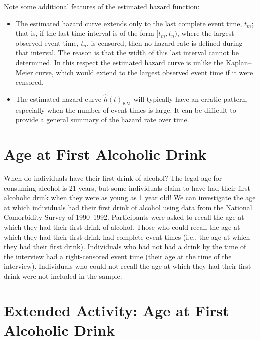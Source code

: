 \documentclass[
]{report}
\providecommand{\tightlist}{%
  \setlength{\itemsep}{0pt}\setlength{\parskip}{0pt}}
\begin{document}
Note some additional features of the estimated hazard function:

\begin{itemize}
\tightlist
\item
  The estimated hazard curve extends only to the last complete event time, \(t_m\); that is, if the last time interval is of the form \([t_m, t_n)\), where the largest observed event time, \(t_n\), is censored, then no hazard rate is defined during that interval. The reason is that the width of this last interval cannot be determined. In this respect the estimated hazard curve is unlike the Kaplan--Meier curve, which would extend to the largest observed event time if it were censored.\\
\item
  The estimated hazard curve \(\hat h(t)_{\mathrm{KM}}\) will typically have an erratic pattern, especially when the number of event times is large. It can be difficult to provide a general summary of the hazard rate over time.
\end{itemize}

\section*{Age at First Alcoholic Drink}\label{age-at-first-alcoholic-drink}

When do individuals have their first drink of alcohol? The legal age for consuming alcohol is 21 years, but some individuals claim to have had their first alcoholic drink when they were as young as 1 year old! We can investigate the age at which individuals had their first drink of alcohol using data from the National Comorbidity Survey of 1990--1992. Participants were asked to recall the age at which they had their first drink of alcohol. Those who could recall the age at which they had their first drink had complete event times (i.e., the age at which they had their first drink). Individuals who had not had a drink by the time of the interview had a right-censored event time (their age at the time of the interview). Individuals who could not recall the age at which they had their first drink were not included in the sample.

\section*{Extended Activity: Age at First Alcoholic Drink}\label{extended-activity-age-at-first-alcoholic-drink}
\end{document}
